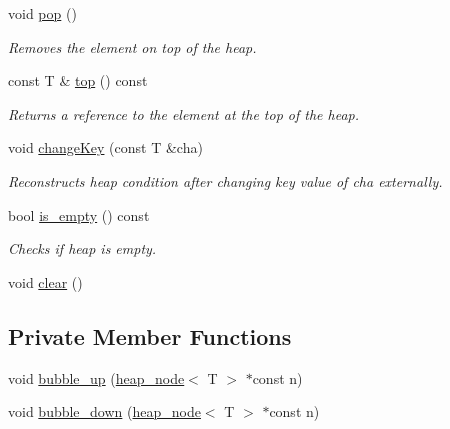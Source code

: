 \begin{DoxyCompactItemize}
void \mbox{\hyperlink{classbin__heap_ab463bc655b2f46cd5ff021cab28b1210}{pop}} ()
\begin{DoxyCompactList}\small\item\em Removes the element on top of the heap. \end{DoxyCompactList}\item 
const T \& \mbox{\hyperlink{classbin__heap_acd711ddeafe82630f153906da7e8fa1c}{top}} () const
\begin{DoxyCompactList}\small\item\em Returns a reference to the element at the top of the heap. \end{DoxyCompactList}\item 
void \mbox{\hyperlink{classbin__heap_ab1353fe40c5cfc1205314a4db6334f1b}{change\+Key}} (const T \&cha)
\begin{DoxyCompactList}\small\item\em Reconstructs heap condition after changing key value of {\ttfamily cha} externally. \end{DoxyCompactList}\item 
bool \mbox{\hyperlink{classbin__heap_a2bbb9cf5cc5cda265c8603c561b796a5}{is\+\_\+empty}} () const
\begin{DoxyCompactList}\small\item\em Checks if heap is empty. \end{DoxyCompactList}\item 
void \mbox{\hyperlink{classbin__heap_abf7a6189fcb48e435fc156f764e38f1d}{clear}} ()
\end{DoxyCompactItemize}
\subsection*{Private Member Functions}
\begin{DoxyCompactItemize}
\item 
void \mbox{\hyperlink{classbin__heap_aefc41dde4f1decfe523d23eb3d5e885f}{bubble\+\_\+up}} (\mbox{\hyperlink{classheap__node}{heap\+\_\+node}}$<$ T $>$ $\ast$const n)
\item 
void \mbox{\hyperlink{classbin__heap_a6c16b71925f4df063778aadc527a6fc6}{bubble\+\_\+down}} (\mbox{\hyperlink{classheap__node}{heap\+\_\+node}}$<$ T $>$ $\ast$const n)
\end{DoxyCompactItemize}
